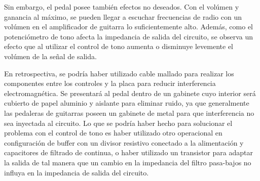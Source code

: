Sin embargo, el pedal posee también efectos no deseados. Con el volúmen y ganancia al máximo, se pueden llegar a escuchar frecuencias de radio con un volúmen en el amplificador de guitarra lo suficientemente alto. Además, como el potenciómetro de tono afecta la impedancia de salida del circuito, se observa un efecto que al utilizar el control de tono aumenta o disminuye levemente el volúmen de la señal de salida.

En retrospectiva, se podría haber utilizado cable mallado para realizar los componentes entre los controles y la placa para reducir interferencia electromagnética. Se presentará al pedal dentro de un gabinete cuyo interior será cubierto de papel aluminio y aislante para eliminar ruido, ya que generalmente las pedaleras de guitarras poseen un gabinete de metal para que interferencia no sea inyectada al circuito.
Lo que se podría haber hecho para solucionar el problema con el control de tono es haber utilizado otro operacional en configuración de buffer con un divisor resistivo conectado a la alimentación y capacitores de filtrado de continua, o haber utilizado un transistor para adaptar la salida de tal manera que un cambio en la impedancia del filtro pasa-bajos no influya en la impedancia de salida del circuito.
